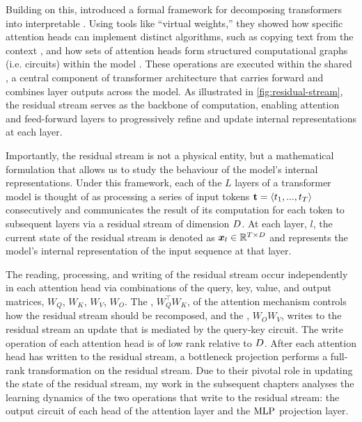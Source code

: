 Building on this, \citet{elhage2021mathematical} introduced a formal framework for decomposing transformers into interpretable . Using tools like “virtual weights,” they showed how specific attention heads can implement distinct algorithms, such as copying text from the context \citep{olsson2022inductionheads}, and how sets of attention heads form structured computational graphs (i.e. circuits) within the model \citep{ameisen2025circuit}. These operations are executed within the shared , a central component of transformer architecture that carries forward and combines layer outputs across the model. As illustrated in \cref{fig:residual-stream}, the residual stream serves as the backbone of computation, enabling attention and feed-forward layers to progressively refine and update internal representations at each layer. 
 
Importantly, the residual stream is not a physical entity, but a mathematical formulation that allows us to study the behaviour of the model's internal representations. Under this framework, each of the $L$ layers of a transformer model is thought of as processing a series of input tokens $\boldsymbol{\mathrm{t}} = \langle t_1, ..., t_T\rangle$ consecutively and communicates the result of its computation for each token to subsequent layers via a residual stream of dimension $D$. At each layer, $l$, the current state of the residual stream is denoted as $\boldsymbol{x}_l \in \mathbb{R}^{T \times D}$ and represents the model's internal representation of the input sequence at that layer.

The reading, processing, and writing of the residual stream occur independently in each attention head via combinations of the query, key, value, and output matrices, $W_Q$, $W_K$, $W_V$, $W_O$. The , $W_Q^{\top}W_K$, of the attention mechanism controls how the residual stream should be recomposed, and the , $W_OW_V$, writes to the residual stream an update that is mediated by the query-key circuit. The write operation of each attention head is of low rank relative to $D$. After each attention head has written to the residual stream, a bottleneck  projection performs a full-rank transformation on the residual stream. Due to their pivotal role in updating the state of the residual stream, my work in the subsequent chapters analyses the learning dynamics of the two operations that write to the residual stream: the output circuit of each head of the attention layer and the $\mathrm{MLP}$ projection layer.


